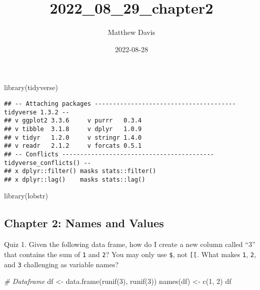 \documentclass[
]{article}
\title{2022\_08\_29\_chapter2}
\author{Matthew Davis}
\date{2022-08-28}
\newenvironment{Shaded}{\begin{snugshade}}{\end{snugshade}}
\newcommand{\CommentTok}[1]{\textcolor[rgb]{0.56,0.35,0.01}{\textit{#1}}}
\newcommand{\DecValTok}[1]{\textcolor[rgb]{0.00,0.00,0.81}{#1}}
\newcommand{\FunctionTok}[1]{\textcolor[rgb]{0.00,0.00,0.00}{#1}}
\newcommand{\NormalTok}[1]{#1}
\newcommand{\OtherTok}[1]{\textcolor[rgb]{0.56,0.35,0.01}{#1}}
\begin{document}
\maketitle

\begin{Shaded}
\begin{Highlighting}[]
\FunctionTok{library}\NormalTok{(tidyverse)}
\end{Highlighting}
\end{Shaded}

\begin{verbatim}
## -- Attaching packages --------------------------------------- tidyverse 1.3.2 --
## v ggplot2 3.3.6     v purrr   0.3.4
## v tibble  3.1.8     v dplyr   1.0.9
## v tidyr   1.2.0     v stringr 1.4.0
## v readr   2.1.2     v forcats 0.5.1
## -- Conflicts ------------------------------------------ tidyverse_conflicts() --
## x dplyr::filter() masks stats::filter()
## x dplyr::lag()    masks stats::lag()
\end{verbatim}

\begin{Shaded}
\begin{Highlighting}[]
\FunctionTok{library}\NormalTok{(lobstr)}
\end{Highlighting}
\end{Shaded}

\hypertarget{chapter-2-names-and-values}{%
\subsection{Chapter 2: Names and
Values}\label{chapter-2-names-and-values}}

Quiz 1. Given the following data frame, how do I create a new column
called ``3'' that contains the sum of \texttt{1} and \texttt{2}? You may
only use \texttt{\$}, not \texttt{{[}{[}}. What makes \texttt{1},
\texttt{2}, and \texttt{3} challenging as variable names?

\begin{Shaded}
\begin{Highlighting}[]
\CommentTok{\# Dataframe}
\NormalTok{df }\OtherTok{\textless{}{-}} \FunctionTok{data.frame}\NormalTok{(}\FunctionTok{runif}\NormalTok{(}\DecValTok{3}\NormalTok{), }\FunctionTok{runif}\NormalTok{(}\DecValTok{3}\NormalTok{))}
\FunctionTok{names}\NormalTok{(df) }\OtherTok{\textless{}{-}} \FunctionTok{c}\NormalTok{(}\DecValTok{1}\NormalTok{, }\DecValTok{2}\NormalTok{)}
\NormalTok{df}
\end{Highlighting}
\end{Shaded}
\end{document}
